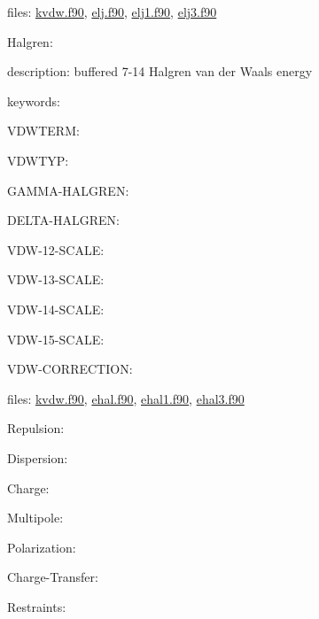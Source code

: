 files\-: \hyperlink{kvdw_8f90}{kvdw.\-f90}, \hyperlink{elj_8f90}{elj.\-f90}, \hyperlink{elj1_8f90}{elj1.\-f90}, \hyperlink{elj3_8f90}{elj3.\-f90}


\begin{DoxyItemize}
\item Halgren\-:
\begin{DoxyItemize}
\item description\-: buffered 7-\/14 Halgren van der Waals energy
\item keywords\-:
\begin{DoxyItemize}
\item V\-D\-W\-T\-E\-R\-M\-:
\item V\-D\-W\-T\-Y\-P\-:
\item G\-A\-M\-M\-A-\/\-H\-A\-L\-G\-R\-E\-N\-:
\item D\-E\-L\-T\-A-\/\-H\-A\-L\-G\-R\-E\-N\-:
\item V\-D\-W-\/12-\/\-S\-C\-A\-L\-E\-:
\item V\-D\-W-\/13-\/\-S\-C\-A\-L\-E\-:
\item V\-D\-W-\/14-\/\-S\-C\-A\-L\-E\-:
\item V\-D\-W-\/15-\/\-S\-C\-A\-L\-E\-:
\item V\-D\-W-\/\-C\-O\-R\-R\-E\-C\-T\-I\-O\-N\-:
\end{DoxyItemize}
\end{DoxyItemize}
\end{DoxyItemize}

files\-: \hyperlink{kvdw_8f90}{kvdw.\-f90}, \hyperlink{ehal_8f90}{ehal.\-f90}, \hyperlink{ehal1_8f90}{ehal1.\-f90}, \hyperlink{ehal3_8f90}{ehal3.\-f90}


\begin{DoxyItemize}
\item Repulsion\-:
\item Dispersion\-:
\item Charge\-:
\item Multipole\-:
\item Polarization\-:
\item Charge-\/\-Transfer\-:
\item Restraints\-: 
\end{DoxyItemize}